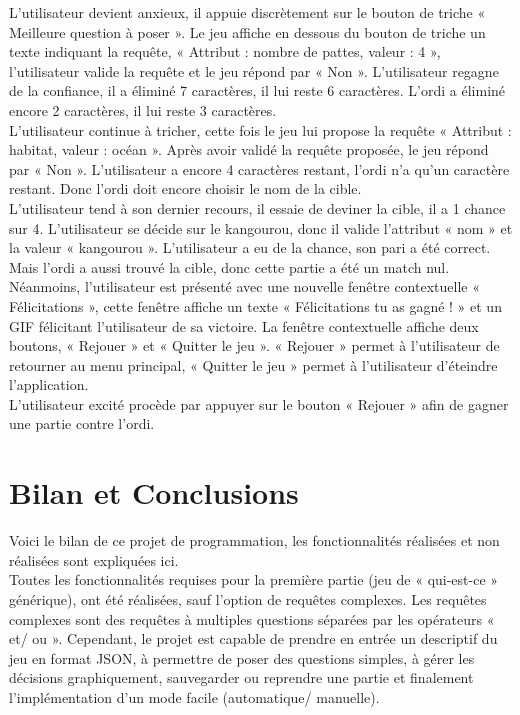 \documentclass[a4paper]{article}
\begin{document}
L’utilisateur devient anxieux, il appuie discrètement sur le bouton de triche « Meilleure question à poser ». Le jeu affiche en dessous du bouton de triche un texte indiquant la requête, « Attribut : nombre de pattes, valeur :  4 », l’utilisateur valide la requête et le jeu répond par « Non ». L’utilisateur regagne de la confiance, il a éliminé 7 caractères, il lui reste 6 caractères. L’ordi a éliminé encore 2 caractères, il lui reste 3 caractères.\\

L’utilisateur continue à tricher, cette fois le jeu lui propose la requête « Attribut : habitat, valeur :  océan ». Après avoir validé la requête proposée, le jeu répond par « Non ». L’utilisateur a encore 4 caractères restant, l’ordi n’a qu’un caractère restant. Donc l’ordi doit encore choisir le nom de la cible.\\

L’utilisateur tend à son dernier recours, il essaie de deviner la cible, il a 1 chance sur 4. L’utilisateur se décide sur le kangourou, donc il valide l’attribut « nom » et la valeur « kangourou ». L’utilisateur a eu de la chance, son pari a été correct. Mais l’ordi a aussi trouvé la cible, donc cette partie a été un match nul. Néanmoins, l’utilisateur est présenté avec une nouvelle fenêtre contextuelle « Félicitations », cette fenêtre affiche un texte « Félicitations tu as gagné ! » et un GIF félicitant l’utilisateur de sa victoire. La fenêtre contextuelle affiche deux boutons, « Rejouer » et « Quitter le jeu ». « Rejouer » permet à l’utilisateur de retourner au menu principal, « Quitter le jeu » permet à l’utilisateur d’éteindre l’application.\\

L’utilisateur excité procède par appuyer sur le bouton « Rejouer » afin de gagner une partie contre l’ordi.



\section{Bilan et Conclusions}

Voici le bilan de ce projet de programmation, les fonctionnalités réalisées et non réalisées sont expliquées ici.\\

Toutes les fonctionnalités requises pour la première partie (jeu de « qui-est-ce » générique), ont été réalisées, sauf l’option de requêtes complexes. Les requêtes complexes sont des requêtes à multiples questions séparées par les opérateurs « et/ ou ». Cependant, le projet est capable de prendre en entrée un descriptif du jeu en format JSON, à permettre de poser des questions simples, à gérer les décisions graphiquement, sauvegarder ou reprendre une partie et finalement l’implémentation d’un mode facile (automatique/ manuelle).\\
\end{document}
